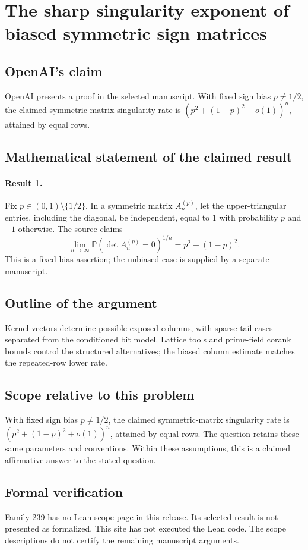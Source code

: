 \documentclass[11pt]{article}
\begin{document}
\section*{The sharp singularity exponent of biased symmetric sign matrices}

\subsection{OpenAI's claim}
OpenAI presents a proof in the selected manuscript. With fixed sign bias $p\ne1/2$, the claimed symmetric-matrix singularity rate is $(p^2+(1-p)^2+o(1))^n$, attained by equal rows.

\subsection{Mathematical statement of the claimed result}
\paragraph{Result 1.} Fix \(p\in(0,1)\setminus\{1/2\}\). In a symmetric matrix \(A_n^{(p)}\), let the upper-triangular entries, including the diagonal, be independent, equal to \(1\) with probability \(p\) and \(-1\) otherwise. The source claims
\[
 \lim_{n\to\infty}\mathbb P(\det A_n^{(p)}=0)^{1/n}=p^2+(1-p)^2.
\]
This is a fixed-bias assertion; the unbiased case is supplied by a separate manuscript.

\subsection{Outline of the argument}
Kernel vectors determine possible exposed columns, with sparse-tail cases separated from the conditioned bit model. Lattice tools and prime-field corank bounds control the structured alternatives; the biased column estimate matches the repeated-row lower rate.

\subsection{Scope relative to this problem}
With fixed sign bias $p\ne1/2$, the claimed symmetric-matrix singularity rate is $(p^2+(1-p)^2+o(1))^n$, attained by equal rows. The question retains these same parameters and conventions. Within these assumptions, this is a claimed affirmative answer to the stated question.

\subsection{Formal verification}
Family 239 has no Lean scope page in this release. Its selected result is not presented as formalized. This site has not executed the Lean code. The scope descriptions do not certify the remaining manuscript arguments.
\end{document}

